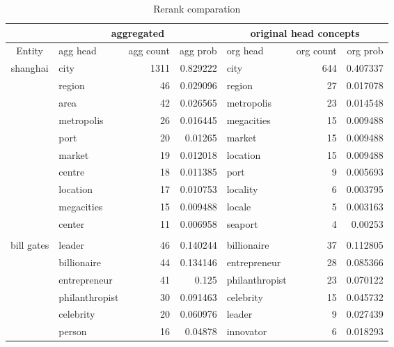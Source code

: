 \begin{table*}[htbp!]
  \centering
  \caption{Rerank comparation}
    \begin{tabular}{llrrlrr}
    \toprule
    \multicolumn{1}{c}{} & \multicolumn{3}{c}{aggregated} & \multicolumn{3}{c}{original head concepts} \\
    \midrule
    \multicolumn{1}{c}{Entity} & agg head & agg count & agg prob & org head & org count & org prob \\
    \midrule
    \multicolumn{1}{c}{\multirow{10}[0]{*}{shanghai}} & city  & 1311  & 0.829222 & city  & 644   & 0.407337 \\
    \multicolumn{1}{c}{} & region & 46    & 0.029096 & region & 27    & 0.017078 \\
    \multicolumn{1}{c}{} & area  & 42    & 0.026565 & metropolis & 23    & 0.014548 \\
    \multicolumn{1}{c}{} & metropolis & 26    & 0.016445 & megacities & 15    & 0.009488 \\
    \multicolumn{1}{c}{} & port  & 20    & 0.01265 & market & 15    & 0.009488 \\
    \multicolumn{1}{c}{} & market & 19    & 0.012018 & location & 15    & 0.009488 \\
    \multicolumn{1}{c}{} & centre & 18    & 0.011385 & port  & 9     & 0.005693 \\
    \multicolumn{1}{c}{} & location & 17    & 0.010753 & locality & 6     & 0.003795 \\
    \multicolumn{1}{c}{} & megacities & 15    & 0.009488 & locale & 5     & 0.003163 \\
    \multicolumn{1}{c}{} & center & 11    & 0.006958 & seaport & 4     & 0.00253 \\
          &       &       &       &       &       &  \\
    \multicolumn{1}{c}{\multirow{10}[0]{*}{bill gates}} & leader & 46    & 0.140244 & billionaire & 37    & 0.112805 \\
    \multicolumn{1}{c}{} & billionaire & 44    & 0.134146 & entrepreneur & 28    & 0.085366 \\
    \multicolumn{1}{c}{} & entrepreneur & 41    & 0.125 & philanthropist & 23    & 0.070122 \\
    \multicolumn{1}{c}{} & philanthropist & 30    & 0.091463 & celebrity & 15    & 0.045732 \\
    \multicolumn{1}{c}{} & celebrity & 20    & 0.060976 & leader & 9     & 0.027439 \\
    \multicolumn{1}{c}{} & person & 16    & 0.04878 & innovator & 6     & 0.018293 \\

\end{tabular}
\end{table*}
